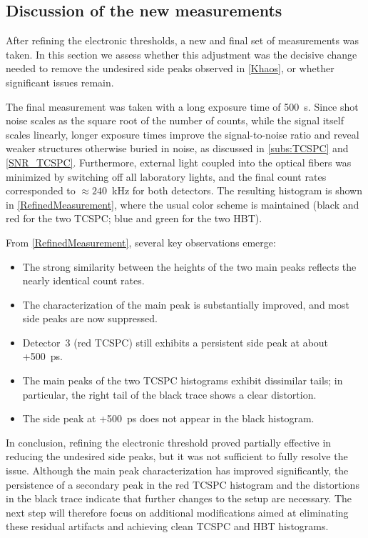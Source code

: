 \subsection{Discussion of the new measurements}
After refining the electronic thresholds, a new and final set of measurements was taken.
In this section we assess whether this adjustment was the decisive change needed to remove the undesired side peaks observed in \autoref{Khaos}, or whether significant issues remain.

The final measurement was taken with a long exposure time of 500~s.
Since shot noise scales as the square root of the number of counts, while the signal itself scales linearly, longer exposure times improve the signal-to-noise ratio and reveal weaker structures otherwise buried in noise, as discussed in \autoref{subs:TCSPC} and \autoref{SNR_TCSPC}.
Furthermore, external light coupled into the optical fibers was minimized by switching off all laboratory lights, and the final count rates corresponded to $\approx 240$~kHz for both detectors.
The resulting histogram is shown in \autoref{RefinedMeasurement}, where the usual color scheme is maintained (black and red for the two TCSPC; blue and green for the two HBT).

From \autoref{RefinedMeasurement}, several key observations emerge:
\begin{itemize}
\item The strong similarity between the heights of the two main peaks reflects the nearly identical count rates.
\item The characterization of the main peak is substantially improved, and most side peaks are now suppressed.
\item Detector~3 (red TCSPC) still exhibits a persistent side peak at about +500~ps.
\item The main peaks of the two TCSPC histograms exhibit dissimilar tails; in particular, the right tail of the black trace shows a clear distortion.
\item The side peak at +500~ps does not appear in the black histogram.
\end{itemize}

In conclusion, refining the electronic threshold proved partially effective in reducing the undesired side peaks, but it was not sufficient to fully resolve the issue. 
Although the main peak characterization has improved significantly, the persistence of a secondary peak in the red TCSPC histogram and the distortions in the black trace indicate that further changes to the setup are necessary. 
The next step will therefore focus on additional modifications aimed at eliminating these residual artifacts and achieving clean TCSPC and HBT histograms.





